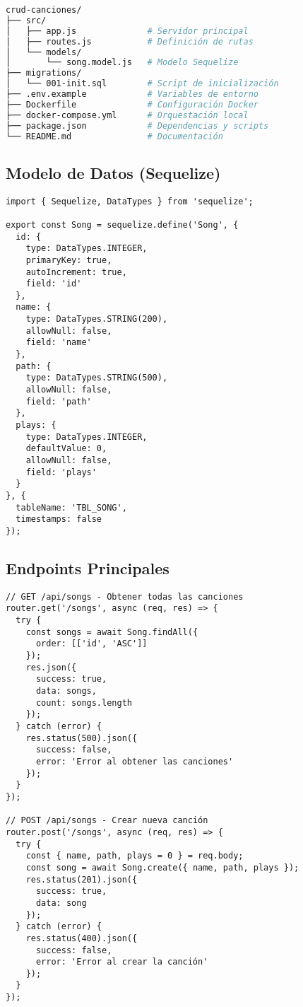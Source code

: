 \documentclass[12pt,a4paper]{article}
\begin{document}
\begin{lstlisting}[language=bash, caption=Estructura de directorios del proyecto]
crud-canciones/
├── src/
│   ├── app.js              # Servidor principal
│   ├── routes.js           # Definición de rutas
│   └── models/
│       └── song.model.js   # Modelo Sequelize
├── migrations/
│   └── 001-init.sql        # Script de inicialización
├── .env.example            # Variables de entorno
├── Dockerfile              # Configuración Docker
├── docker-compose.yml      # Orquestación local
├── package.json            # Dependencias y scripts
└── README.md               # Documentación
\end{lstlisting}

\subsection{Modelo de Datos (Sequelize)}

\begin{lstlisting}[caption=Implementación del modelo Song]
import { Sequelize, DataTypes } from 'sequelize';

export const Song = sequelize.define('Song', {
  id: {
    type: DataTypes.INTEGER,
    primaryKey: true,
    autoIncrement: true,
    field: 'id'
  },
  name: {
    type: DataTypes.STRING(200),
    allowNull: false,
    field: 'name'
  },
  path: {
    type: DataTypes.STRING(500),
    allowNull: false,
    field: 'path'
  },
  plays: {
    type: DataTypes.INTEGER,
    defaultValue: 0,
    allowNull: false,
    field: 'plays'
  }
}, {
  tableName: 'TBL_SONG',
  timestamps: false
});
\end{lstlisting}

\subsection{Endpoints Principales}

\begin{lstlisting}[caption=Implementación de rutas CRUD]
// GET /api/songs - Obtener todas las canciones
router.get('/songs', async (req, res) => {
  try {
    const songs = await Song.findAll({
      order: [['id', 'ASC']]
    });
    res.json({
      success: true,
      data: songs,
      count: songs.length
    });
  } catch (error) {
    res.status(500).json({
      success: false,
      error: 'Error al obtener las canciones'
    });
  }
});

// POST /api/songs - Crear nueva canción
router.post('/songs', async (req, res) => {
  try {
    const { name, path, plays = 0 } = req.body;
    const song = await Song.create({ name, path, plays });
    res.status(201).json({
      success: true,
      data: song
    });
  } catch (error) {
    res.status(400).json({
      success: false,
      error: 'Error al crear la canción'
    });
  }
});
\end{lstlisting}
\end{document}
